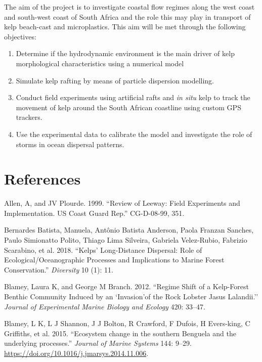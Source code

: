 \documentclass[
]{article}
\begin{document}
The aim of the project is to investigate coastal flow regimes along the
west coast and south-west coast of South Africa and the role this may
play in transport of kelp beach-cast and microplastics. This aim will be
met through the following objectives:

\begin{enumerate}
\def\labelenumi{\arabic{enumi}.}
\item
  Determine if the hydrodynamic environment is the main driver of kelp
  morphological characteristics using a numerical model
\item
  Simulate kelp rafting by means of particle dispersion modelling.
\item
  Conduct field experiments using artificial rafts and \emph{in situ}
  kelp to track the movement of kelp around the South African coastline
  using custom GPS trackers.
\item
  Use the experimental data to calibrate the model and investigate the
  role of storms in ocean dispersal patterns.
\end{enumerate}

\hypertarget{references}{%
\section*{References}\label{references}}

\hypertarget{refs}{}
\leavevmode\hypertarget{ref-allen1999review}{}%
Allen, A, and JV Plourde. 1999. ``Review of Leeway: Field Experiments
and Implementation. US Coast Guard Rep.'' CG-D-08-99, 351.

\leavevmode\hypertarget{ref-bernardes2018}{}%
Bernardes Batista, Manuela, Antônio Batista Anderson, Paola Franzan
Sanches, Paulo Simionatto Polito, Thiago Lima Silveira, Gabriela
Velez-Rubio, Fabrizio Scarabino, et al. 2018. ``Kelps' Long-Distance
Dispersal: Role of Ecological/Oceanographic Processes and Implications
to Marine Forest Conservation.'' \emph{Diversity} 10 (1): 11.

\leavevmode\hypertarget{ref-Blamey2012}{}%
Blamey, Laura K, and George M Branch. 2012. ``Regime Shift of a
Kelp-Forest Benthic Community Induced by an `Invasion'of the Rock
Lobster Jasus Lalandii.'' \emph{Journal of Experimental Marine Biology
and Ecology} 420: 33--47.

\leavevmode\hypertarget{ref-Blamey2015}{}%
Blamey, L K, L J Shannon, J J Bolton, R Crawford, F Dufois, H
Evers-king, C Griffiths, et al. 2015. ``Ecosystem change in the southern
Benguela and the underlying processes.'' \emph{Journal of Marine
Systems} 144: 9--29.
\url{https://doi.org/10.1016/j.jmarsys.2014.11.006}.
\end{document}

